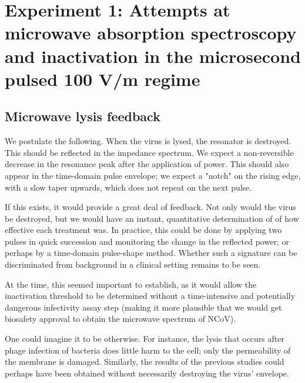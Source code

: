 \documentclass[paper.tex]{subfiles}
\begin{document}
\section{Experiment 1: Attempts at microwave absorption spectroscopy and inactivation in the microsecond pulsed 100 V/m regime}


\subsection{Microwave lysis feedback}

We postulate the following. When the virus is lysed, the resonator is destroyed. This should be reflected in the impedance spectrum.
We expect a non-reversible decrease in the resonance peak after the application of power. This should also appear in the time-domain pulse envelope; we expect a "notch" on the rising edge, with a slow taper upwards, which does not repeat on the next pulse.

If this exists, it would provide a great deal of feedback. Not only would the virus be destroyed, but we would have an instant, quantitative determination of of how effective each treatment was. In practice, this could be done by applying two pulses in quick succession and monitoring the change in the reflected power; or perhaps by a time-domain pulse-shape method. Whether such a signature can be discriminated from background in a clinical setting remains to be seen.

At the time, this seemed important to establish, as it would allow the inactivation threshold to be determined without a time-intensive and potentially dangerous infectivity assay step (making it more plausible that we would get biosafety approval to obtain the microwave spectrum of NCoV). 

One could imagine it to be otherwise. For instance, the lysis that occurs after phage infection of bacteria does little harm to the cell; only the permeability of the membrane is damaged\cite{GROWTH}. Similarly, the results of the previous studies could perhaps have been obtained without necessarily destroying the virus' envelope.
\end{document}
